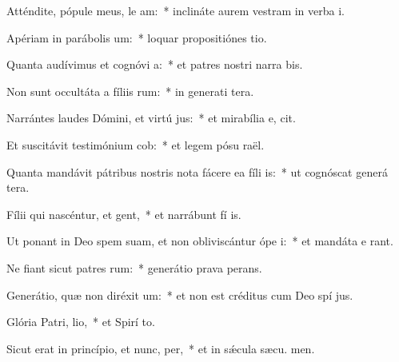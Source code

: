 \item Atténdite, pópule meus, le am:~* inclináte aurem vestram in verba  i.
\item Apériam in parábolis  um:~* loquar propositiónes  tio.
\item Quanta audívimus et cognóvi a:~* et patres nostri narra bis.
\item Non sunt occultáta a fíliis rum:~* in generati tera.
\item Narrántes laudes Dómini, et virtú jus:~* et mirabília e,  cit.
\item Et suscitávit testimónium  cob:~* et legem pósu  raël.
\item Quanta mandávit pátribus nostris nota fácere ea fíli is:~* ut cognóscat generá tera.
\item Fílii qui nascéntur, et gent,~* et narrábunt fí is.
\item Ut ponant in Deo spem suam, et non obliviscántur ópe i:~* et mandáta e rant.
\item Ne fiant sicut patres rum:~* generátio prava  perans.
\item Generátio, quæ non diréxit  um:~* et non est créditus cum Deo spí jus.
\item Glória Patri,  lio,~* et Spirí to.
\item Sicut erat in princípio, et nunc,  per,~* et in sǽcula sæcu. men.
